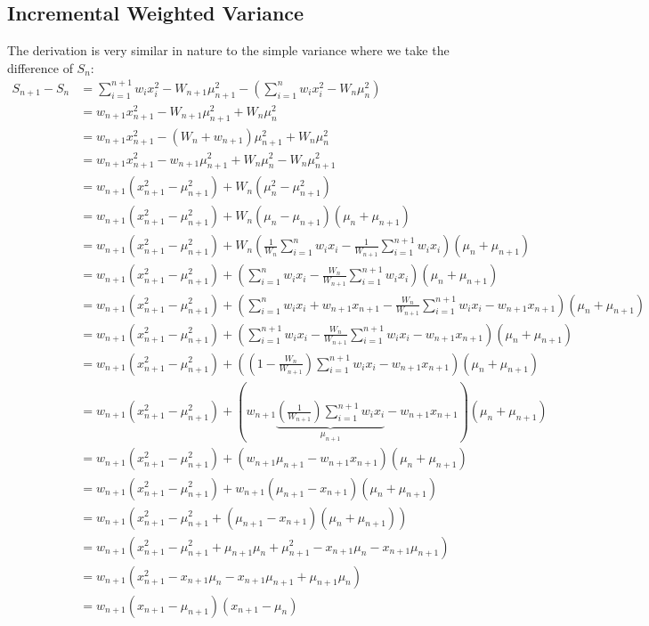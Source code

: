 \documentclass[english,12pt]{article}
\theoremstyle{plain}
\theoremstyle{definition}
\theoremstyle{definition} %
\newcommand{\brac}[1]{\left(#1\right)} %
\begin{document}
\subsection{Incremental Weighted Variance}
The derivation is very similar in nature to the simple variance where we take the difference of $S_n$:
\begin{align*}
S_{n+1} - S_n &= \sum_{i=1}^{n+1} w_ix_i^2 - W_{n+1}\mu_{n+1}^2 - \brac{\sum_{i=1}^n w_ix_i^2 - W_n\mu_n^2}\\
&=w_{n+1}x_{n+1}^2 - W_{n+1}\mu_{n+1}^2 + W_n\mu_n^2\\
&=w_{n+1}x_{n+1}^2 - (W_{n} + w_{n+1})\mu_{n+1}^2 + W_n\mu_n^2\\
&=w_{n+1}x_{n+1}^2 -  w_{n+1}\mu_{n+1}^2  + W_n\mu_n^2 - W_{n}\mu_{n+1}^2\\
&=w_{n+1}(x_{n+1}^2 -  \mu_{n+1}^2)  + W_n(\mu_n^2 - \mu_{n+1}^2)\\
&=w_{n+1}(x_{n+1}^2 -  \mu_{n+1}^2)  + W_n(\mu_n - \mu_{n+1})(\mu_n + \mu_{n+1})\\
&=w_{n+1}(x_{n+1}^2 -  \mu_{n+1}^2)  + W_n\brac{\frac{1}{W_n}\sum_{i=1}^n w_ix_i - \frac{1}{W_{n+1}}\sum_{i=1}^{n+1}w_ix_i}(\mu_n + \mu_{n+1})\\
&=w_{n+1}(x_{n+1}^2 -  \mu_{n+1}^2)  + \brac{\sum_{i=1}^n w_ix_i - \frac{W_n}{W_{n+1}}\sum_{i=1}^{n+1}w_ix_i}(\mu_n + \mu_{n+1})\\
&=w_{n+1}(x_{n+1}^2 -  \mu_{n+1}^2)  + \brac{\sum_{i=1}^n w_ix_i + w_{n+1}x_{n+1} - \frac{W_n}{W_{n+1}}\sum_{i=1}^{n+1}w_ix_i - w_{n+1}x_{n+1}}(\mu_n + \mu_{n+1})\\
&=w_{n+1}(x_{n+1}^2 -  \mu_{n+1}^2)  + \brac{\sum_{i=1}^{n+1} w_ix_i - \frac{W_n}{W_{n+1}}\sum_{i=1}^{n+1}w_ix_i - w_{n+1}x_{n+1}}(\mu_n + \mu_{n+1})\\
&=w_{n+1}(x_{n+1}^2 -  \mu_{n+1}^2)  + \brac{\brac{1-\frac{W_n}{W_{n+1}}}\sum_{i=1}^{n+1} w_ix_i - w_{n+1}x_{n+1}}(\mu_n + \mu_{n+1})\\
&=w_{n+1}(x_{n+1}^2 -  \mu_{n+1}^2)  + \brac{w_{n+1}\underbrace{\brac{\frac{1}{W_{n+1}}}\sum_{i=1}^{n+1} w_ix_i}_{\mu_{n+1}} - w_{n+1}x_{n+1}}(\mu_n + \mu_{n+1})\\
&=w_{n+1}(x_{n+1}^2 -  \mu_{n+1}^2)  + (w_{n+1}\mu_{n+1} - w_{n+1}x_{n+1})(\mu_n + \mu_{n+1})\\
&=w_{n+1}(x_{n+1}^2 -  \mu_{n+1}^2)  + w_{n+1}(\mu_{n+1} - x_{n+1})(\mu_n + \mu_{n+1})\\
&=w_{n+1}(x_{n+1}^2 -  \mu_{n+1}^2  + (\mu_{n+1} - x_{n+1})(\mu_n + \mu_{n+1}))\\
&=w_{n+1}(x_{n+1}^2 -  \mu_{n+1}^2  + \mu_{n+1}\mu_n + \mu_{n+1}^2 - x_{n+1}\mu_n - x_{n+1}\mu_{n+1})\\
&=w_{n+1}(x_{n+1}^2 - x_{n+1}\mu_n - x_{n+1}\mu_{n+1} + \mu_{n+1}\mu_n)\\
&=w_{n+1}(x_{n+1} - \mu_{n+1})(x_{n+1} - \mu_n)
\end{align*}
\end{document}

